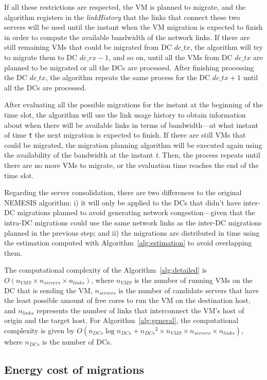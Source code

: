 If all these restrictions are respected, the VM is planned to migrate, and the algorithm registers in the \textit{linkHistory} that the links that connect these two servers will be used until the instant when the VM migration is expected to finish in order to compute the available bandwidth of the network links.  If there are still remaining VMs that could be migrated from DC $dc\_tx$, the algorithm will try to migrate them to DC $dc\_rx -1 $, and so on, until all the VMs from DC $dc\_tx$ are planned to be migrated or all the DCs are processed. After finishing processing the DC $dc\_tx$, the algorithm repeats the same process for the DC $dc\_tx +1$ until all the DCs are processed.

After evaluating all the possible migrations for the instant at the beginning of the time slot, the algorithm will use the link usage history to obtain information about when there will be available links in terms of bandwidth---at what instant of time \texttt{t} the next migration is expected to finish.  If there are still VMs that could be migrated, the migration planning algorithm will be executed again using the availability of the bandwidth at the instant \textit{t}. Then, the process repeats until there are no more VMs to migrate, or the evaluation time reaches the end of the time slot.

Regarding the server consolidation, there are two differences to the original NEMESIS algorithm: i) it will only be applied to the DCs that didn't have inter-DC migrations planned to avoid generating network congestion---given that the intra-DC migrations could use the same network links as the inter-DC migrations planned in the previous step; and ii) the migrations are distributed in time using the estimation computed with Algorithm~\ref{alg:estimation} to avoid overlapping them.


The computational complexity of the Algorithm~\ref{alg:detailed} is $O(n_{VMS} \times  n_{servers} \times n_{links}  )$, where $n_{VMS}$ is the number of running VMs on the DC that is sending the VM, $n_{servers}$ is the number of candidate servers that have the least possible amount of free cores to run the VM on the destination host, and $n_{links}$ represents the number of links that interconnect the VM's host of origin and the target host. For Algorithm~\ref{alg:general}, the computational complexity is given by $O(n_{DCs}\log{}n_{DCs} + {n_{DCs}}^{2} \times n_{VMS} \times  n_{servers} \times n_{links})$, where $n_{DCs}$ is the number of DCs.

\subsection{Energy cost of migrations}\label{sec:energy_costs_mig}

